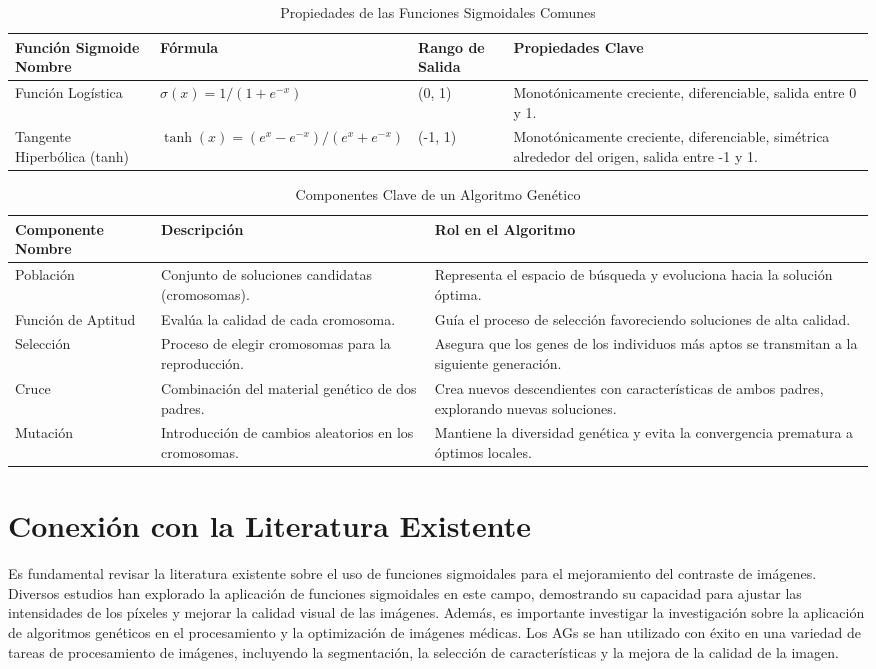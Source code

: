\begin{table}[htbp]
\centering
\caption{Propiedades de las Funciones Sigmoidales Comunes}
\begin{tabular}{|p{3cm}|p{3cm}|p{3cm}|p{5cm}|}
\hline
\textbf{Función Sigmoide Nombre} & \textbf{Fórmula} & \textbf{Rango de Salida} & \textbf{Propiedades Clave} \\
\hline
Función Logística & $\sigma(x) = 1 / (1 + e^{-x})$ & (0, 1) & Monotónicamente creciente, diferenciable, salida entre 0 y 1. \\
\hline
Tangente Hiperbólica (tanh) & $\tanh(x) = (e^{x} - e^{-x}) / (e^{x} + e^{-x})$ & (-1, 1) & Monotónicamente creciente, diferenciable, simétrica alrededor del origen, salida entre -1 y 1. \\
\hline
\end{tabular}
\end{table}

\begin{table}[htbp]
\centering
\caption{Componentes Clave de un Algoritmo Genético}
\begin{tabular}{|p{3cm}|p{6cm}|p{6cm}|}
\hline
\textbf{Componente Nombre} & \textbf{Descripción} & \textbf{Rol en el Algoritmo} \\
\hline
Población & Conjunto de soluciones candidatas (cromosomas). & Representa el espacio de búsqueda y evoluciona hacia la solución óptima. \\
\hline
Función de Aptitud & Evalúa la calidad de cada cromosoma. & Guía el proceso de selección favoreciendo soluciones de alta calidad. \\
\hline
Selección & Proceso de elegir cromosomas para la reproducción. & Asegura que los genes de los individuos más aptos se transmitan a la siguiente generación. \\
\hline
Cruce & Combinación del material genético de dos padres. & Crea nuevos descendientes con características de ambos padres, explorando nuevas soluciones. \\
\hline
Mutación & Introducción de cambios aleatorios en los cromosomas. & Mantiene la diversidad genética y evita la convergencia prematura a óptimos locales. \\
\hline
\end{tabular}
\end{table}

\section{Conexión con la Literatura Existente}
Es fundamental revisar la literatura existente sobre el uso de funciones sigmoidales para el mejoramiento del contraste de imágenes. Diversos estudios han explorado la aplicación de funciones sigmoidales en este campo, demostrando su capacidad para ajustar las intensidades de los píxeles y mejorar la calidad visual de las imágenes. Además, es importante investigar la investigación sobre la aplicación de algoritmos genéticos en el procesamiento y la optimización de imágenes médicas. Los AGs se han utilizado con éxito en una variedad de tareas de procesamiento de imágenes, incluyendo la segmentación, la selección de características y la mejora de la calidad de la imagen.


